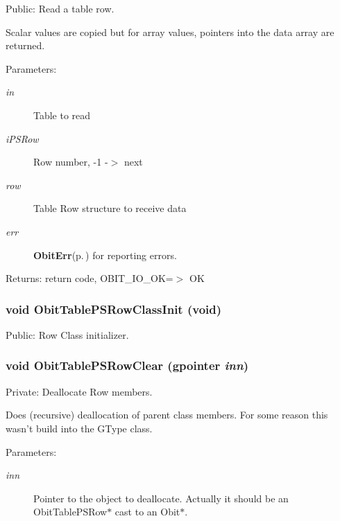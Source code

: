 Public: Read a table row. 

Scalar values are copied but for array values, pointers into the data array are returned. \begin{Desc}
\item[Parameters:]
\begin{description}
\item[{\em in}]Table to read \item[{\em i\-PSRow}]Row number, -1 -$>$ next \item[{\em row}]Table Row structure to receive data \item[{\em err}]{\bf Obit\-Err}{\rm (p.\,\pageref{structObitErr})} for reporting errors. \end{description}
\end{Desc}
\begin{Desc}
\item[Returns:]return code, OBIT\_\-IO\_\-OK=$>$ OK \end{Desc}
\subsubsection{\setlength{\rightskip}{0pt plus 5cm}void Obit\-Table\-PSRow\-Class\-Init (void)}\label{ObitTablePS_8c_a26}


Public: Row Class initializer. 

\subsubsection{\setlength{\rightskip}{0pt plus 5cm}void Obit\-Table\-PSRow\-Clear (gpointer {\em inn})}\label{ObitTablePS_8c_a7}


Private: Deallocate Row members. 

Does (recursive) deallocation of parent class members. For some reason this wasn't build into the GType class. \begin{Desc}
\item[Parameters:]
\begin{description}
\item[{\em inn}]Pointer to the object to deallocate. Actually it should be an Obit\-Table\-PSRow$\ast$ cast to an Obit$\ast$. \end{description}
\end{Desc}
